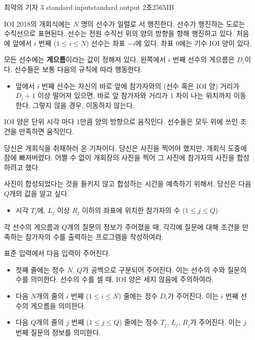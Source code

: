 \begin{problem}{최악의 기자 3}
	{standard input}{standard output}
	{2초}{256MB}{}
	
	IOI 2018의 개회식에는 $N$ 명의 선수가 일렬로 서 행진한다. 선수가 행진하는 도로는 수직선으로 표현된다. 선수는 전원 수직선 위의 양의 방향을 향해 행진하고 있다. 처음에 앞에서 $i$ 번째 ($1 \le i \le N$) 선수는 좌표 $-i$에 있다. 좌표 0에는 기수 IOI 양이 있다.
	
	모든 선수에는 \textbf{게으름}이라는 값이 정해져 있다. 왼쪽에서 $i$ 번째 선수의 게으름은 $D_i$이다. 선수들은 보통 다음의 규칙에 따라 행동한다.
	
	\begin{itemize}
		\item 앞에서 $i$ 번째 선수는 자신의 바로 앞에 참가자와의 (선수 혹은 IOI 양) 거리가 $D_i+1$ 이상 떨어져 있으면, 바로 앞 참가자와 거리가 1 차이 나는 위치까지 이동한다. 그렇지 않을 경우, 이동하지 않는다.
	\end{itemize}
	
	IOI 양은 단위 시각 마다 1만큼 양의 방향으로 움직인다. 선수들은 모두 위에 쓰인 조건을 만족하면 움직인다.
	
	당신은 개회식을 취재하러 온 기자이다. 당신은 사진을 찍어야 했지만, 개회식 도중에 잠에 빠져버렸다. 어쩔 수 없이 개회장의 사진을 찍어 그 사진에 참가자의 사진을 합성하려고 했다.
	
	사진이 합성되었다는 것을 들키지 않고 합성하는 시간을 예측하기 위해서, 당신은 다음 $Q$개의 값을 알고 싶다.
	
	\begin{itemize}
		\item 시각 $T_j$에, $L_j$ 이상 $R_j$ 이하의 좌표에 위치한 참가자의 수 ($1 \le j \le Q$)
	\end{itemize}

	각 선수의 게으름과 $Q$개의 질문의 정보가 주어졌을 때, 각각에 질문에 대해 조건을 만족하는 참가자의 수를 출력하는 프로그램을 작성하여라.
	
	
	\InputFile
	
	표준 입력에서 다음 입력이 주어진다.
	
	\begin{itemize}
		\item 첫째 줄에는 정수 $N$, $Q$가 공백으로 구분되어 주어진다. 이는 선수의 수와 질문의 수를 의미한다. 선수의 수를 셀 때, IOI 양은 세지 않음에 주의하여라.
		\item 다음 $N$개의 줄의 $i$ 번째 ($1 \le i \le N$) 줄에는 정수 $D_i$가 주어진다. 이는 $i$ 번째 선수의 게으름을 의미한다.
		\item 다음 $Q$개의 줄의 $j$ 번째 ($1 \le j \le Q$) 줄에는 정수 $T_j$, $L_j$, $R_j$가 주어진다. 이는 $j$ 번째 질문의 정보를 의미한다.
	\end{itemize}
		

\end{problem}
